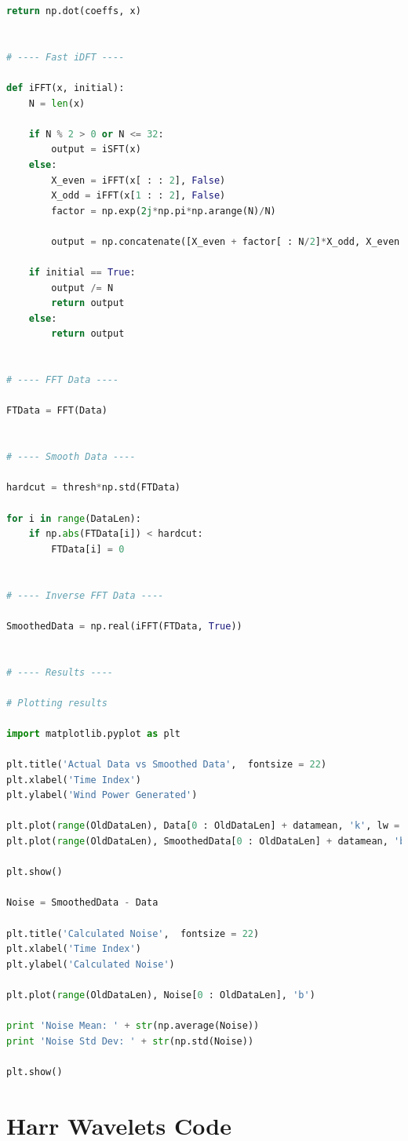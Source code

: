 \documentclass[11pt]{article}
\theoremstyle{definition}
\begin{document}
\begin{lstlisting}[language = Python]
    return np.dot(coeffs, x)


# ---- Fast iDFT ----

def iFFT(x, initial):
    N = len(x)

    if N % 2 > 0 or N <= 32:
        output = iSFT(x)
    else:
        X_even = iFFT(x[ : : 2], False)
        X_odd = iFFT(x[1 : : 2], False)
        factor = np.exp(2j*np.pi*np.arange(N)/N)

        output = np.concatenate([X_even + factor[ : N/2]*X_odd, X_even + factor[N/2 : ]*X_odd])

    if initial == True:
        output /= N
        return output
    else:
        return output


# ---- FFT Data ----

FTData = FFT(Data)


# ---- Smooth Data ----

hardcut = thresh*np.std(FTData)

for i in range(DataLen):
    if np.abs(FTData[i]) < hardcut:
        FTData[i] = 0


# ---- Inverse FFT Data ----

SmoothedData = np.real(iFFT(FTData, True))


# ---- Results ----

# Plotting results

import matplotlib.pyplot as plt

plt.title('Actual Data vs Smoothed Data',  fontsize = 22)
plt.xlabel('Time Index')
plt.ylabel('Wind Power Generated')

plt.plot(range(OldDataLen), Data[0 : OldDataLen] + datamean, 'k', lw = 3)
plt.plot(range(OldDataLen), SmoothedData[0 : OldDataLen] + datamean, 'b')

plt.show()

Noise = SmoothedData - Data

plt.title('Calculated Noise',  fontsize = 22)
plt.xlabel('Time Index')
plt.ylabel('Calculated Noise')

plt.plot(range(OldDataLen), Noise[0 : OldDataLen], 'b')

print 'Noise Mean: ' + str(np.average(Noise))
print 'Noise Std Dev: ' + str(np.std(Noise))

plt.show()
\end{lstlisting}

\pagebreak


\section{Harr Wavelets Code}
\end{document}
